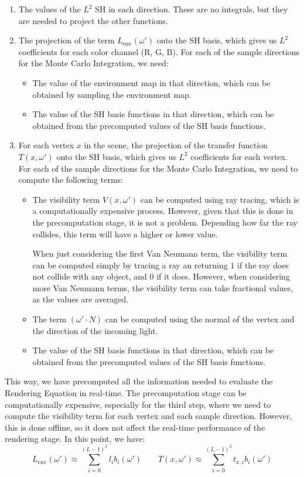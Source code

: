 \begin{enumerate}
    \item The values of the $L^2$ SH in each direction. These are no integrals, but they are needed to project the other functions.
    \item The projection of the term $L_{\text{env}}(\omega')$ onto the SH basis, which gives us $L^2$ coefficients for each color channel (R, G, B). For each of the sample directions for the Monte Carlo Integration, we need:
    \begin{itemize}
        \item The value of the environment map in that direction, which can be obtained by sampling the environment map.
        \item The value of the SH basis functions in that direction, which can be obtained from the precomputed values of the SH basis functions.
    \end{itemize}
    \item For each vertex $x$ in the scene, the projection of the transfer function $T(x, \omega')$ onto the SH basis, which gives us $L^2$ coefficients for each vertex. For each of the sample directions for the Monte Carlo Integration, we need to compute the following terms:
    \begin{itemize}
        \item The visibility term $V(x, \omega')$ can be computed using ray tracing, which is a computationally expensive process. However, given that this is done in the precomputation stage, it is not a problem. Depending how far the ray collides, this term will have a higher or lower value.
        
        When just considering the first Van Neumann term, the visibility term can be computed simply by tracing a ray an returning $1$ if the ray does not collide with any object, and $0$ if it does. However, when considering more Van Neumann terms, the visibility term can take fractional values, as the values are averaged.
        \item The term $(\omega' \cdot N)$ can be computed using the normal of the vertex and the direction of the incoming light.
        \item The value of the SH basis functions in that direction, which can be obtained from the precomputed values of the SH basis functions.
    \end{itemize}
\end{enumerate}

This way, we have precomputed all the information needed to evaluate the Rendering Equation in real-time. The precomputation stage can be computationally expensive, especially for the third step, where we need to compute the visibility term for each vertex and each sample direction. However, this is done offline, so it does not affect the real-time performance of the rendering stage. In this point, we have:
\begin{equation*}
    L_{\text{env}}(\omega') \approx \sum_{i=0}^{(L-1)^2} l_i b_i(\omega') \qquad T(x, \omega') \approx \sum_{i=0}^{(L-1)^2} t_{x,i} b_i(\omega')
\end{equation*}

